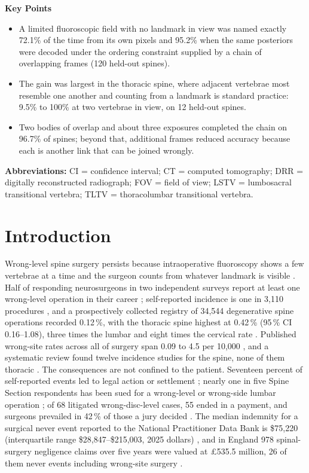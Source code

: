 \documentclass[11pt,letterpaper]{article}
\begin{document}
\medskip
\noindent\textbf{Key Points}
\begin{itemize}\setlength\itemsep{0pt}
\item A limited fluoroscopic field with no landmark in view was named exactly 72.1\% of the time from its own
pixels and 95.2\% when the same posteriors were decoded under the ordering constraint supplied by a chain of
overlapping frames (120 held-out spines).
\item The gain was largest in the thoracic spine, where adjacent vertebrae most resemble one another and
counting from a landmark is standard practice: 9.5\% to 100\% at two vertebrae in view, on 12 held-out spines.
\item Two bodies of overlap and about three exposures completed the chain on 96.7\% of spines; beyond that,
additional frames reduced accuracy because each is another link that can be joined wrongly.
\end{itemize}

\noindent\textbf{Abbreviations:} CI = confidence interval; CT = computed tomography; DRR = digitally
reconstructed radiograph; FOV = field of view; LSTV = lumbosacral transitional vertebra; TLTV =
thoracolumbar transitional vertebra.

\clearpage

\section*{Introduction}

Wrong-level spine surgery persists because intraoperative fluoroscopy shows a few vertebrae at a time and the
surgeon counts from whatever landmark is visible \citep{mayer2008,hsiang2011}. Half of responding
neurosurgeons in two independent surveys report at least one wrong-level operation in their career
\citep{mody2008,groff2013}; self-reported incidence is one in 3,110 procedures \citep{mody2008}, and a
prospectively collected registry of 34,544 degenerative spine operations recorded 0.12\,\%, with the
thoracic spine highest at 0.42\,\% (95\,\% CI 0.16--1.08), three times the lumbar and eight times the cervical
rate \citep{furuya2026}. Published wrong-site rates across all of surgery span 0.09 to 4.5 per 10,000
\citep{devine2010}, and a systematic review found twelve incidence studies for the spine, none of them
thoracic \citep{longo2012}. The consequences are not confined to the patient. Seventeen percent of
self-reported events led to legal action or settlement \citep{mody2008}; nearly one in five Spine Section
respondents has been sued for a wrong-level or wrong-side lumbar operation \citep{groff2013}; of 68
litigated wrong-disc-level cases, 55 ended in a payment, and surgeons prevailed in 42\,\% of those a jury
decided \citep{goodkin2004}. The median indemnity for a surgical never event reported to the National
Practitioner Data Bank is \$75,220 (interquartile range \$28,847--\$215,003, 2025 dollars)
\citep{bettis2026}, and in England 978 spinal-surgery negligence claims over five years were valued at
\pounds535.5 million, 26 of them never events including wrong-site surgery \citep{machin2018}.
\end{document}

